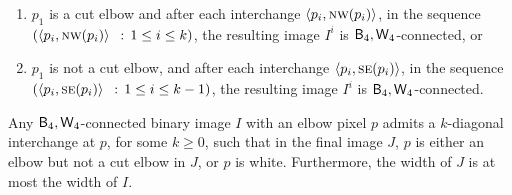 \documentclass[lotsofwhite,charterfonts]{patmorin}
\newcommand{\fourfour}{\ensuremath{\protect\textup{\textsf{B}}_{4},\protect\textup{\textsf{W}}_{4}}}
\newcommand{\SE}{\textsc{se}}
\newcommand{\NW}{\textsc{nw}}
\newcommand{\ic}[2]{\langle #1,#2 \rangle}
\begin{document}
\begin{enumerate}
\item $p_1$ is a cut elbow and after each interchange
$\ic{p_i}{\NW(p_i)}$, in the sequence  $(\ic{p_i}{\NW(p_i)}\,\ :\,
1\leq i\leq k)$, the resulting image $I^i$ is $\fourfour$-connected,
or

\item $p_1$ is not a cut elbow, and after each interchange
$\ic{p_i}{\SE(p_i)}$, in the sequence  $(\ic{p_i}{\SE(p_i)}\,\ :\,
1\leq i\leq k-1)$, the resulting image $I^i$ is $\fourfour$-connected.
\end{enumerate}

\begin{lem}
Any \fourfour-connected binary image $I$ with an elbow pixel $p$
admits a $k$-diagonal interchange at $p$, for some $k\geq 0$, such
that in the final image $J$, $p$ is either an elbow but not a cut
elbow in $J$, or $p$ is white. Furthermore, the width of $J$ is at
most the width of $I$. 
\end{lem}
\end{document}
